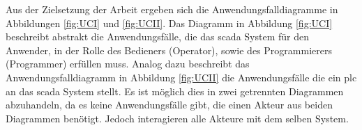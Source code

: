 Aus der Zielsetzung der Arbeit ergeben sich die Anwendungsfalldiagramme in Abbildungen \ref{fig:UCI} und \ref{fig:UCII}.
Das Diagramm in Abbildung \ref{fig:UCI} beschreibt abstrakt die Anwendungsfälle, die das \ac{scada} System für den Anwender, in der Rolle des Bedieners (Operator), 
sowie des Programmierers (Programmer) erfüllen muss.
Analog dazu beschreibt das Anwendungsfalldiagramm in Abbildung \ref{fig:UCII} die Anwendungsfälle die ein \ac{plc} an das \ac{scada} System stellt.
Es ist möglich dies in zwei getrennten Diagrammen abzuhandeln, da es keine Anwendungsfälle gibt, die einen Akteur aus beiden Diagrammen benötigt.
Jedoch interagieren alle Akteure mit dem selben System.

